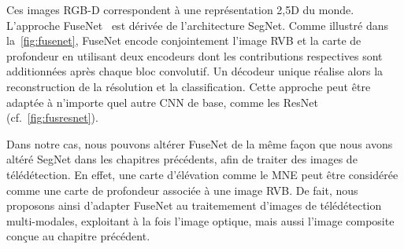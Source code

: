 Ces images \gls{RGB-D} correspondent à une représentation 2,5D du monde. L'approche FuseNet~\cite{hazirbas_fusenet_2016} est dérivée de l'architecture SegNet. Comme illustré dans la~\cref{fig:fusenet}, FuseNet encode conjointement l'image \gls{RVB} et la carte de profondeur en utilisant deux encodeurs dont les contributions respectives sont additionnées après chaque bloc convolutif. Un décodeur unique réalise alors la reconstruction de la résolution et la classification. Cette approche peut être adaptée à n'importe quel autre \gls{CNN} de base, comme les ResNet (cf.~\cref{fig:fusresnet}).

Dans notre cas, nous pouvons altérer FuseNet de la même façon que nous avons altéré SegNet dans les chapitres précédents, afin de traiter des images de télédétection. En effet, une carte d'élévation comme le \gls{MNE} peut être considérée comme une carte de profondeur associée à une image \gls{RVB}. De fait, nous proposons ainsi d'adapter FuseNet au traitemement d'images de télédétection multi-modales, exploitant à la fois l'image optique, mais aussi l'image composite conçue au chapitre précédent.



